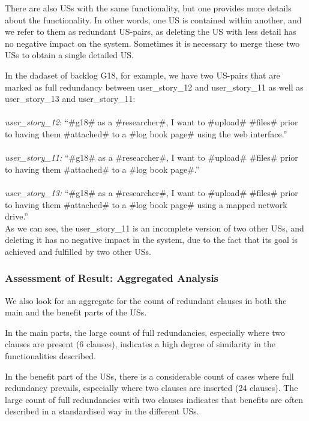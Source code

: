 There are also USs with the same functionality, but one provides more details about the functionality. In other words, one US is contained within another, and we refer to them as 
redundant US-pairs, as deleting the US with less detail has no negative impact on the system. Sometimes it is necessary to merge these two USs to obtain a single detailed US.
\begin{example}
In the dadaset of backlog G18, for example, we have two US-pairs that are marked as full redundancy between user\_story\_12 and user\_story\_11 as well as user\_story\_13 and user\_story\_11:\\\\
\textit{user\_story\_12}: \enquote{\#g18\# as a \#researcher\#, I want to \#upload\# \#files\# prior to having them \#attached\# to a \#log book page\# using the web interface.}\\\\
\textit{user\_story\_11:} \enquote{\#g18\# as a \#researcher\#, I want to \#upload\# \#files\# prior to having them \#attached\# to a \#log book page\#.}\\\\
\textit{user\_story\_13:} \enquote{\#g18\# as a \#researcher\#, I want to \#upload\# \#files\# prior to having them \#attached\# to a \#log book page\# using a mapped network drive.}\\

As we can see, the user\_story\_11 is an incomplete version of two other USs, and deleting it has no negative impact in the system, due to the fact that its goal is achieved and fulfilled by two other USs.
\end{example}
\subsubsection*{Assessment of Result: Aggregated Analysis}
We also look for an aggregate for the count of redundant clauses in both the main and the benefit parts of the USs. 

In the main parts, the large count of full redundancies, especially where two clauses are present (6 clauses), indicates a high degree of similarity in the functionalities described.

In the benefit part of the USs, there is a considerable count of cases where full redundancy prevails, especially where two clauses are inserted (24 clauses). The large count of full redundancies with two clauses indicates that benefits are often described in a standardised way in the different USs.

